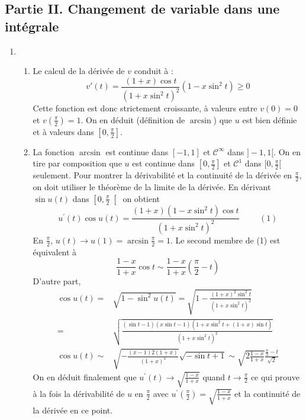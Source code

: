 \subsection*{Partie II. Changement de variable dans une intégrale}
\begin{enumerate}
\item 
\begin{enumerate}
\item  Le calcul de la dérivée de $v$ conduit à :
\begin{displaymath}
  v'(t) = \frac{(1+x)\cos t}{(1+x\sin^2t)^2}(1-x\sin^2t) \geq 0
\end{displaymath}
Cette fonction est donc strictement croissante, à valeurs entre $v(0)=0$ et $v(\frac{\pi}{2})=1$. On en déduit (définition de $\arcsin$) que $u$ est bien définie et à valeurs dans $[0,\frac{\pi}{2}]$.

\item La fonction $\arcsin$ est continue dans $[-1,1]$ et $\mathcal{C}^{\infty}$ dans $]-1,1[$. On en tire par composition que $u$ est continue dans $[0,\frac{\pi}{2}]$ et $\mathcal{C}^1$ dans $[0,\frac{\pi}{2}[$ seulement.\newline
Pour montrer la dérivabilité et la continuité de la dérivée en $\frac{\pi}{2}$, on doit utiliser le théorème de la limite de la dérivée. En d\'{e}rivant $\sin u(t)$ dans $\left[ 0,\frac{\pi }{2}\right[ $ on obtient
\begin{displaymath}
u^{\prime }(t)\cos u(t)=\frac{(1+x)(1-x\sin ^{2}t)\cos t}{(1+x\sin ^{2}t)^{2}} \hspace{1cm}(1)
\end{displaymath}
En $\frac{\pi }{2}$, $u(t)\rightarrow u(1)=\arcsin \frac{\pi}{2}=1$. Le second membre de (1) est \'{e}quivalent \`{a}
\begin{displaymath}
\frac{1-x}{1+x}\cos t\sim \frac{1-x}{1+x}(\frac{\pi }{2}-t)
\end{displaymath}
D'autre part,
\begin{align*}
\cos u(t)  =& \sqrt{1-\sin ^{2}u(t)}=\sqrt{1-\frac{(1+x)^{2}\sin ^{2}t}{(1+x\sin ^{2}t)^{2}}}\\
=& \sqrt{\frac{(\sin t-1)(x\sin t-1)(1+x\sin^{2}t+(1+x)\sin t)}{(1+x\sin ^{2}t)^{2}}} \\
\cos u(t) \sim &\sqrt{-\frac{(x-1)2(1+x)}{(1+x)^{2}}}\sqrt{-\sin t+1}\sim 
\sqrt{2\frac{1-x}{1+x}}\frac{\frac{\pi }{2}-t}{\sqrt{2}}
\end{align*}
On en d\'{e}duit finalement que $u^{\prime }(t)\rightarrow \sqrt{\frac{1-x}{1+x}}$ quand $t\rightarrow \frac{\pi }{2}$ ce qui prouve \`{a} la fois la d\'{e}rivabilit\'{e} de $u$ en $\frac{\pi }{2}$ avec $u^{\prime }(\frac{\pi }{2})=\sqrt{\frac{1-x}{1+x}}$ et la continuit\'{e} de la d\'{e}riv\'{e}e en ce point.


\end{enumerate}
\end{enumerate}
